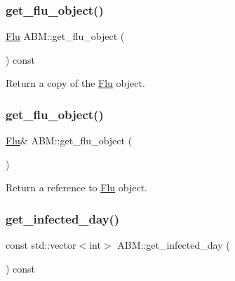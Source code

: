 \mbox{\label{classABM_acb7023998f3b647d4dd8d095992d5dab}} 
\subsubsection{\texorpdfstring{get\+\_\+flu\+\_\+object()}{get\_flu\_object()}\hspace{0.1cm}{\footnotesize\ttfamily [1/2]}}
{\footnotesize\ttfamily \hyperlink{classFlu}{Flu} A\+B\+M\+::get\+\_\+flu\+\_\+object (\begin{DoxyParamCaption}{ }\end{DoxyParamCaption}) const\hspace{0.3cm}{\ttfamily [inline]}}



Return a copy of the \hyperlink{classFlu}{Flu} object. 

\mbox{\label{classABM_a66f5f10a0e0eb62e13226298ce518dd9}} 
\subsubsection{\texorpdfstring{get\+\_\+flu\+\_\+object()}{get\_flu\_object()}\hspace{0.1cm}{\footnotesize\ttfamily [2/2]}}
{\footnotesize\ttfamily \hyperlink{classFlu}{Flu}\& A\+B\+M\+::get\+\_\+flu\+\_\+object (\begin{DoxyParamCaption}{ }\end{DoxyParamCaption})\hspace{0.3cm}{\ttfamily [inline]}}



Return a reference to \hyperlink{classFlu}{Flu} object. 

\mbox{\label{classABM_a21d391848b789516cf518abaff719bbc}} 
\subsubsection{\texorpdfstring{get\+\_\+infected\+\_\+day()}{get\_infected\_day()}}
{\footnotesize\ttfamily const std\+::vector$<$int$>$ A\+B\+M\+::get\+\_\+infected\+\_\+day (\begin{DoxyParamCaption}{ }\end{DoxyParamCaption}) const\hspace{0.3cm}{\ttfamily [inline]}}

